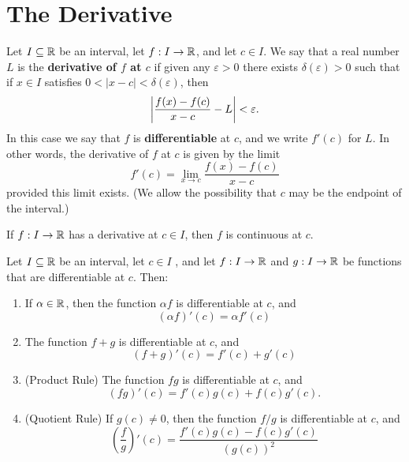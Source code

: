 \section{The Derivative}

\begin{definition}
	Let $I \subseteq \mathbb{R}$ be an interval, let $f:I \rightarrow \mathbb{R}$, and let $ c \in I$. We say that a real number $L$ is the \textbf{derivative of $f$ at $c$}  if given any $\varepsilon > 0$ there exists $\delta (\varepsilon) > 0$ such that if $x \in I$ satisfies $0 < |x-c|<\delta (\varepsilon)$, then
	\[\left\lvert \frac{f(x)-f(c)}{x-c}-L \right\rvert<\varepsilon.\]
	In this case we say that $f$ is \textbf{differentiable} at $c$, and we write $f'(c)$ for $L$. In other words, the derivative of $f$ at $c$ is given by the limit
	\[f'(c) = \lim\limits_{x\to c} \frac{f(x)-f(c)}{x-c}\]
	provided this limit exists. (We allow the possibility that $c$ may be the endpoint of the interval.)
\end{definition}

\begin{theorem}
	If $f:I \rightarrow \mathbb{R}$ has a derivative at $c \in I$, then $f$ is continuous at $c$.
\end{theorem}

\begin{theorem}
	Let $I \subseteq \mathbb{R}$ be an interval, let $c \in I$ , and let $f:I \rightarrow \mathbb{R}$ and $g:I \rightarrow \mathbb{R}$ be functions that are differentiable at $c$. Then:
	\begin{enumerate}
		\item If $\alpha \in \mathbb{R}$, then the function $\alpha f$ is differentiable at $c$, and \[(\alpha f)'(c) = \alpha f'(c)\]

		\item The function $f+g$ is differentiable at $c$, and
		      \[(f+g)'(c) = f'(c)+g'(c)\]

		\item (Product Rule) The function $fg$ is differentiable at $c$, and
		      \[(fg)'(c) = f'(c)g(c) + f(c)g'(c).\]

		\item (Quotient Rule) If $g(c) \neq 0$, then the function $f/g$ is differentiable at $c$, and
		      \[\left( \frac{f}{g}\right)'(c) = \frac{f'(c)g(c)-f(c)g'(c)}{(g(c))^2}\]
	\end{enumerate}
\end{theorem}


